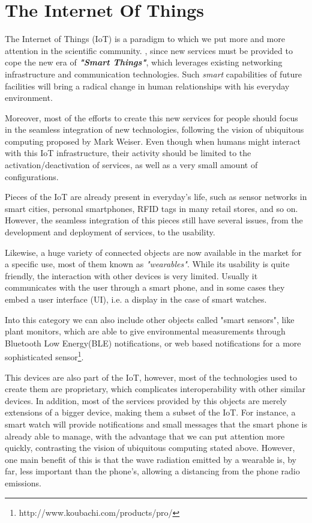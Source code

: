 \chapter{The Internet Of Things}
\label{sec:IoT}
The Internet of Things (IoT) is a paradigm to which we put more and more attention in the scientific community\cite{atzori2010iotsurvey}.
, since new services must be provided to cope the new era of \textit{\textbf{"Smart Things"}}, which leverages existing networking infrastructure and communication technologies.
Such \textit{smart} capabilities of future facilities will bring a radical change in human relationships with his everyday environment.

Moreover, most of the efforts to create this new services for people should focus in the seamless integration of new technologies, following the vision of ubiquitous computing proposed by Mark Weiser\cite{weiser1999ubiquitous}.
Even though when humans might interact with this IoT infrastructure, their activity should be limited to the activation/deactivation of services, as well as a very small amount of configurations.

Pieces of the IoT are already present in everyday's life, such as sensor networks in smart cities, personal smartphones, RFID tags in many retail stores, and so on.
However, the seamless integration of this pieces still have several issues, from the development and deployment of services, to the usability.

Likewise, a huge variety of connected objects are now available in the market for a specific use, most of them known as \textit{"wearables"}.
While its usability is quite friendly, the interaction with other devices is very limited.
Usually it communicates with the user through a smart phone, and in some cases they embed a user interface (UI), i.e. a display in the case of smart watches.

Into this category we can also include other objects called "smart sensors", like plant monitors\cite{bolliger2007koubachi}, which are able to give environmental measurements through Bluetooth Low Energy(BLE) notifications, or web based notifications for a more sophisticated sensor\footnote{http://www.koubachi.com/products/pro/}.

This devices are also part of the IoT\cite{wei2014wearables}, however, most of the technologies used to create them are proprietary, which complicates interoperability with other similar devices.
In addition, most of the services provided by this objects are merely extensions of a bigger device, making them a subset of the IoT.
For instance, a smart watch will provide notifications and small messages that the smart phone is already able to manage, with the advantage that we can put attention more quickly, contrasting the vision of ubiquitous computing stated above.
However, one main benefit of this is that the wave radiation emitted by a wearable is, by far, less important than the phone's, allowing a distancing from the phone radio emissions.

